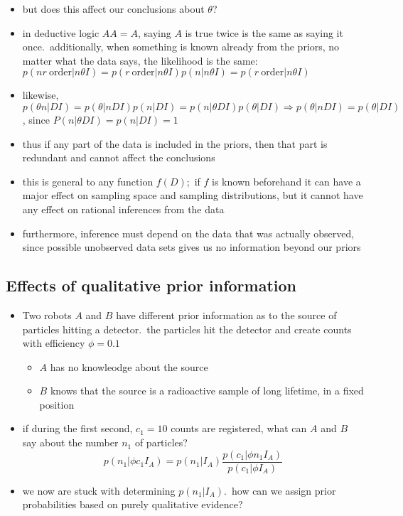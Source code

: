 \documentclass[../jaynes_prob_theory_notes.tex]{subfiles}
\begin{document}
\begin{itemize}
\begin{itemize}
                    \item but does this affect our conclusions about $\theta$?
                    \item in deductive logic $AA = A$, saying $A$ is true twice is the same as saying it once.\ additionally, when something is known already from the priors, no matter what the data says, the likelihood is the same: $p(nr~\mathrm{order}|n{\theta}I) = p(r~\mathrm{order}|n{\theta}I)p(n|n{\theta}I) = p(r~\mathrm{order}|n{\theta}I)$
                    \item likewise, $p({\theta}n|DI) = p(\theta|nDI)p(n|DI) = p(n|{\theta}DI)p(\theta|DI) \Rightarrow p(\theta|nDI) = p(\theta|DI)$, since $P(n|{\theta}DI) = p(n|DI) = 1$
                    \item thus if any part of the data is included in the priors, then that part is redundant and cannot affect the conclusions
                    \item this is general to any function $f(D)$;\ if $f$ is known beforehand it can have a major effect on sampling space and sampling distributions, but it cannot have any effect on rational inferences from the data 
                    \item furthermore, inference must depend on the data that was actually observed, since possible unobserved data sets gives us no information beyond our priors
                \end{itemize}
        \end{itemize}

\subsection{Effects of qualitative prior information}
    \begin{itemize}
        \item Two robots $A$ and $B$ have different prior information as to the source of particles hitting a detector.\ the particles hit the detector and create counts with efficiency $\phi = 0.1$
            \begin{itemize}
                \item $A$ has no knowleodge about the source
                \item $B$ knows that the source is a radioactive sample of long lifetime, in a fixed position
            \end{itemize}
        \item if during the first second, $c_1 = 10$ counts are registered, what can $A$ and $B$ say about the number $n_1$ of particles?
            \begin{equation*}
                p(n_1|{\phi}c_1I_A) = p(n_1|I_A)\frac{p(c_1|{\phi}n_1I_A)}{p(c_1|{\phi}I_A)}
            \end{equation*}
        \item we now are stuck with determining $p(n_1|I_A)$.\ how can we assign prior probabilities based on purely qualitative evidence?
    \end{itemize}
\end{document}

